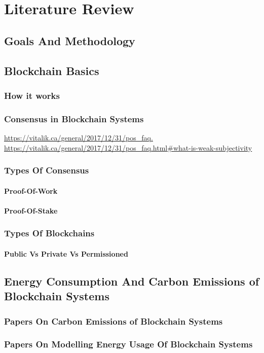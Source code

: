 \chapter{Literature Review}
\section{Goals And Methodology}
\section{Blockchain Basics}
\subsection{How it works}
\subsection{Consensus in Blockchain Systems}
\url{https://vitalik.ca/general/2017/12/31/pos_faq.}
\url{https://vitalik.ca/general/2017/12/31/pos_faq.html#what-is-weak-subjectivity}

\subsection{Types Of Consensus}
\subsubsection{Proof-Of-Work}
\subsubsection{Proof-Of-Stake}
\subsection{Types Of Blockchains}
\subsubsection{Public Vs Private Vs Permissioned}
\section{Energy Consumption And Carbon Emissions of Blockchain Systems}
\subsection{Papers On Carbon Emissions of Blockchain Systems}
\subsection{Papers On Modelling Energy Usage Of Blockchain Systems}
